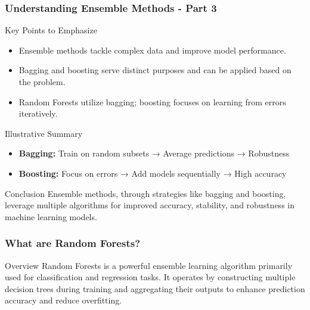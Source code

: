 \documentclass[aspectratio=169]{beamer}
\begin{document}
\begin{frame}[fragile]
    \frametitle{Understanding Ensemble Methods - Part 3}
    \begin{block}{Key Points to Emphasize}
        \begin{itemize}
            \item Ensemble methods tackle complex data and improve model performance.
            \item Bagging and boosting serve distinct purposes and can be applied based on the problem.
            \item Random Forests utilize bagging; boosting focuses on learning from errors iteratively.
        \end{itemize}
    \end{block}

    \begin{block}{Illustrative Summary}
        \begin{itemize}
            \item \textbf{Bagging:} Train on random subsets → Average predictions → Robustness
            \item \textbf{Boosting:} Focus on errors → Add models sequentially → High accuracy
        \end{itemize}
    \end{block}

    \begin{block}{Conclusion}
        Ensemble methods, through strategies like bagging and boosting, leverage multiple algorithms for improved accuracy, stability, and robustness in machine learning models.
    \end{block}
\end{frame}

\begin{frame}[fragile]
    \frametitle{What are Random Forests?}
    \begin{block}{Overview}
        Random Forests is a powerful ensemble learning algorithm primarily used for classification and regression tasks. 
        It operates by constructing multiple decision trees during training and aggregating their outputs to enhance prediction accuracy and reduce overfitting.
    \end{block}
\end{frame}
\end{document}
